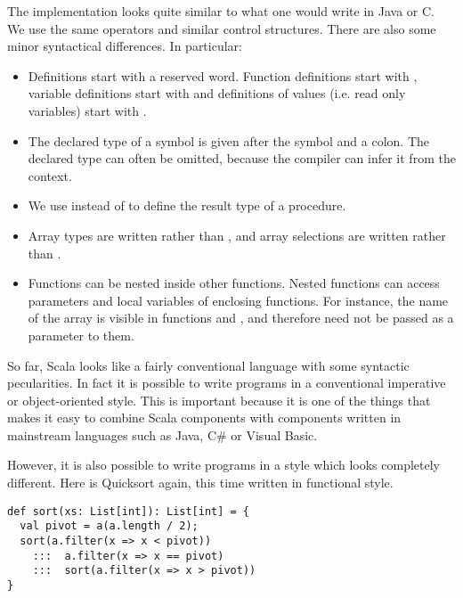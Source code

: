 \documentclass[a4paper,12pt,twoside,titlepage]{book}
\begin{document}
The implementation looks quite similar to what one would write in Java
or C.  We use the same operators and similar control structures.
There are also some minor syntactical differences. In particular:
\begin{itemize}
\item
Definitions start with a reserved word. Function definitions start
with , variable definitions start with  and
definitions of values (i.e. read only variables) start with .
\item
The declared type of a symbol is given after the symbol and a colon.
The declared type can often be omitted, because the compiler can infer
it from the context.
\item
We use  instead of  to define the result type of
a procedure.
\item
Array types are written  rather than , 
and array selections are written  rather than .
\item
Functions can be nested inside other functions. Nested functions can
access parameters and local variables of enclosing functions. For
instance, the name of the array  is visible in functions
 and , and therefore need not be passed as a
parameter to them.
\end{itemize}
So far, Scala looks like a fairly conventional language with some
syntactic pecularities. In fact it is possible to write programs in a
conventional imperative or object-oriented style. This is important
because it is one of the things that makes it easy to combine Scala
components with components written in mainstream languages such as
Java, C\# or Visual Basic.

However, it is also possible to write programs in a style which looks
completely different. Here is Quicksort again, this time written in
functional style.

\begin{lstlisting}
def sort(xs: List[int]): List[int] = {
  val pivot = a(a.length / 2);
  sort(a.filter(x => x < pivot))
    :::  a.filter(x => x == pivot)
    :::  sort(a.filter(x => x > pivot))
}
\end{lstlisting}
\end{document}
